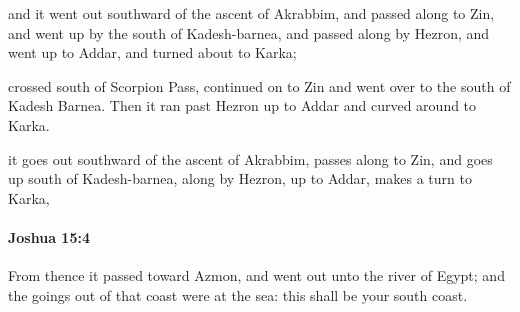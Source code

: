 			\begin{versebox}
					\item[BHS] 
					\item[ASV] and it went out southward of the ascent of Akrabbim, and passed along to Zin, and went up by the south of Kadesh-barnea, and passed along by Hezron, and went up to Addar, and turned about to Karka;
					\item[NIV] crossed south of Scorpion Pass, continued on to Zin and went over to the south of Kadesh Barnea. Then it ran past Hezron up to Addar and curved around to Karka.
					\item[NRSV] it goes out southward of the ascent of Akrabbim, passes along to Zin, and goes up south of Kadesh-barnea, along by Hezron, up to Addar, makes a turn to Karka,
			\end{versebox}

		\paragraph{Joshua 15:4} %
			\label{JOSHUA-15-4}

			From thence it passed toward Azmon, and went out unto the river of Egypt; and the goings out of that coast were at the sea: this shall be your south coast.

